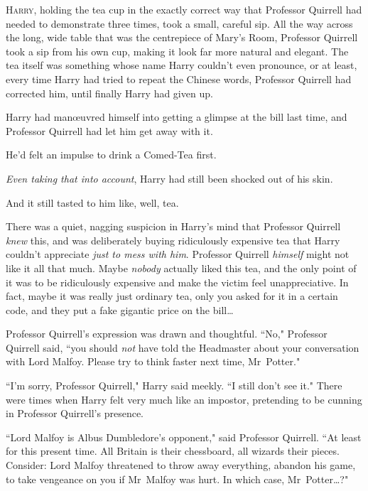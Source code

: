 
\lettrine{H}{arry}, holding the tea cup in the exactly correct way that Professor Quirrell had needed to demonstrate three times, took a small, careful sip. All the way across the long, wide table that was the centrepiece of Mary's Room, Professor Quirrell took a sip from his own cup, making it look far more natural and elegant. The tea itself was something whose name Harry couldn't even pronounce, or at least, every time Harry had tried to repeat the Chinese words, Professor Quirrell had corrected him, until finally Harry had given up.

Harry had manœuvred himself into getting a glimpse at the bill last time, and Professor Quirrell had let him get away with it.

He'd felt an impulse to drink a Comed-Tea first.

\emph{Even taking that into account}, Harry had still been shocked out of his skin.

And it still tasted to him like, well, tea.

There was a quiet, nagging suspicion in Harry's mind that Professor Quirrell \emph{knew} this, and was deliberately buying ridiculously expensive tea that Harry couldn't appreciate \emph{just to mess with him}. Professor Quirrell \emph{himself} might not like it all that much. Maybe \emph{nobody} actually liked this tea, and the only point of it was to be ridiculously expensive and make the victim feel unappreciative. In fact, maybe it was really just ordinary tea, only you asked for it in a certain code, and they put a fake gigantic price on the bill{\ldots}

Professor Quirrell's expression was drawn and thoughtful. ``No," Professor Quirrell said, ``you should \emph{not} have told the Headmaster about your conversation with Lord Malfoy. Please try to think faster next time, Mr~Potter."

``I'm sorry, Professor Quirrell," Harry said meekly. ``I still don't see it." There were times when Harry felt very much like an impostor, pretending to be cunning in Professor Quirrell's presence.

``Lord Malfoy is Albus Dumbledore's opponent," said Professor Quirrell. ``At least for this present time. All Britain is their chessboard, all wizards their pieces. Consider: Lord Malfoy threatened to throw away everything, abandon his game, to take vengeance on you if Mr~Malfoy was hurt. In which case, Mr~Potter{\ldots}?"

